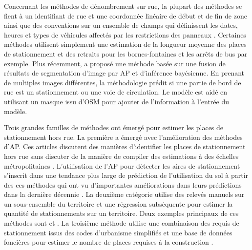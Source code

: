     Concernant les méthodes de dénombrement sur rue, la plupart des méthodes se fient à un identifiant de rue et une coordonnée linéaire de début et de fin de zone ainsi que des conventions sur un ensemble de champs qui définissent les dates, heures et types de véhicules affectés par les restrictions des panneaux \parencite{bourdeau_methodologie_2014,eros_curblr_2025,open_mobility_foundation_curb_2024-1}. Certaines méthodes utilisent simplement une estimation de la longueur moyenne des places de stationnement et des retraits pour les bornes-fontaines et les arrêts de bus par exemple\parencite{chester_parking_2015,chester_inventorying_2022,hoehne_valley_2019}. Plus récemment, \textcite{hellekes_parking_2023} a proposé une méthode basée sur une fusion de résultats de segmentation d'image par \ac{AP} et d'inférence bayésienne. En prenant de multiples images différentes, la méthodologie prédit si une partie de bord de rue est un stationnement ou une voie de circulation. Le modèle est aidé en utilisant un masque issu d'\ac{OSM} pour ajouter de l'information à l'entrée du modèle.  \par
    Trois grandes familles de méthodes ont émergé pour estimer les places de stationnement hors rue. La première a émergé avec l'amélioration des méthodes d'\ac{AP}. Ces articles discutent des manières d'identifier les places de stationnement hors rue sans discuter de la manière de compiler des estimations à des échelles métropolitaines \parencite{hellekes_parking_2023,hurst-tarrab_robust_2020,seo_self-supervised_2009,lichtblau_classification_2019,azimi_skyscapes_2019,qiam_pipeline_2025}. L'utilisation de l'\ac{AP} pour détecter les aires de stationnement s'inscrit dans une tendance plus large de prédiction de l'utilisation du sol à partir des ces méthodes qui ont vu d'importantes améliorations dans leurs prédictions dans la dernière décennie \parencite{ronneberger_u-net_2015,vaswani_attention_2017,lv_deep_2023}. La deuxième catégorie utilise des relevés manuels sur un sous-ensemble du territoire et une régression subséquente pour estimer la quantité de stationnements sur un territoire. Deux exemples principaux de ces méthodes sont \textcite{akbari_analyzing_2003} et \textcite{davis_estimating_2010}. La troisième méthode utilise une combinaison des requis de stationnement issus des codes d'urbanisme simplifiés et une base de données foncières pour estimer le nombre de places requises à la construction \parencite{chester_inventorying_2022,chester_parking_2015,hoehne_valley_2019}. \par
